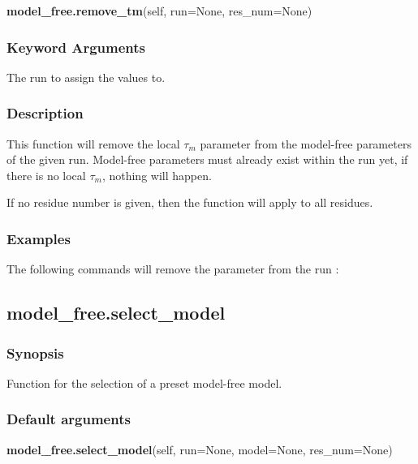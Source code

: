 \textsf{\textbf{model\_free.remove\_tm}(self, run=None, res\_num=None)}


\subsubsection{Keyword Arguments}

  The run to assign the values to.


\subsubsection{Description}

This function will remove the local $\tau_m$ parameter from the model-free parameters of the given
run.  Model-free parameters must already exist within the run yet, if there is no local $\tau_m$,
nothing will happen.

If no residue number is given, then the function will apply to all residues.


\subsubsection{Examples}

The following commands will remove the parameter 
 from the run 
:





\newpage

\subsection{model\_free.select\_model}


\subsubsection{Synopsis}

Function for the selection of a preset model-free model.

\subsubsection{Default arguments}

\textsf{\textbf{model\_free.select\_model}(self, run=None, model=None, res\_num=None)}


